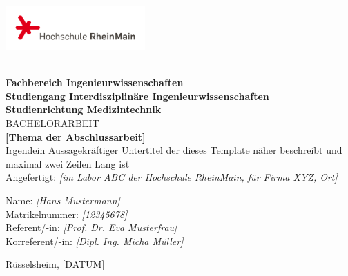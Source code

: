\begin{titlepage}
    \begin{minipage}[t]{\textwidth}
        \raggedleft
        \includegraphics[width=0.4\textwidth]{logo-hsrm-2}%
    \end{minipage}\\[0.5cm]
    
    \centering
    \textbf{Fachbereich Ingenieurwissenschaften}\\[0.5cm]
    \textbf{Studiengang Interdisziplinäre Ingenieurwissenschaften}\\[0.5cm]
    \textbf{Studienrichtung Medizintechnik}\\[1.5cm]

    \LARGE BACHELORARBEIT \\[2.5cm] %
    \Huge \textbf{[Thema der Abschlussarbeit]}\\[0.5cm]
    \LARGE Irgendein Aussagekräftiger Untertitel der dieses Template näher beschreibt und maximal zwei Zeilen Lang ist \\[4cm] 
    
    \large Angefertigt: \textit{[im Labor ABC der Hochschule RheinMain, für Firma XYZ, Ort]}\\[2cm]
    
    \raggedright
    Name: \textit{[Hans Mustermann]} \\[0.3cm]
    Matrikelnummer: \textit{[12345678]} \\[0.3cm]
    Referent/-in: \textit{[Prof. Dr. Eva Musterfrau]} \\[0.3cm]
    Korreferent/-in: \textit{[Dipl. Ing. Micha Müller]} 

    \centering
    \vfill
    Rüsselsheim, [DATUM]
\end{titlepage}
